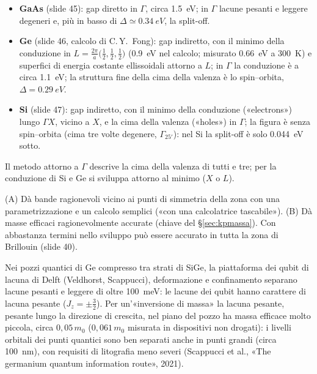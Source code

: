 \documentclass[11pt,a4paper]{article}
\begin{document}
\begin{itemize}[leftmargin=*]
\item \textbf{GaAs} (slide 45): gap diretto in $\Gamma$, circa \SI{1.5}{eV}; in $\Gamma$ lacune pesanti e leggere degeneri e, più in basso
di $\Delta\simeq\SI{0.34}{eV}$, la split-off.
\item \textbf{Ge} (slide 46, calcolo di C.\,Y.~Fong): gap indiretto, con il minimo della conduzione in $L=\frac{2\pi}a\bigl(\frac12,\frac12,\frac12\bigr)$
(\SI{0.9}{eV} nel calcolo; misurato \SI{0.66}{eV} a \SI{300}{K}) e superfici di energia costante ellissoidali attorno a $L$; in $\Gamma$ la
conduzione è a circa \SI{1.1}{eV}; la struttura fine della cima della valenza è lo spin--orbita, $\Delta=\SI{0.29}{eV}$.
\item \textbf{Si} (slide 47): gap indiretto, con il minimo della conduzione («electrons») lungo $\Gamma X$, vicino a $X$, e la cima della valenza
(«holes») in $\Gamma$; la figura è senza spin--orbita (cima tre volte degenere, $\Gamma_{25'}$): nel Si la split-off è solo \SI{0.044}{eV} sotto.
\end{itemize}
Il metodo attorno a $\Gamma$ descrive la cima della valenza di tutti e tre; per la conduzione di Si e Ge si sviluppa attorno al minimo ($X$ o $L$).

(A) Dà bande ragionevoli vicino ai punti di simmetria della zona con una parametrizzazione e un calcolo semplici («con una calcolatrice tascabile»).
(B) Dà masse efficaci ragionevolmente accurate (chiave del §\ref{sec:kpmassa}). Con abbastanza termini nello sviluppo può essere accurato in tutta la
zona di Brillouin (slide 40).

\begin{infobox}
Nei pozzi quantici di Ge compresso tra strati di SiGe, la piattaforma dei qubit di lacuna di Delft (Veldhorst, Scappucci), deformazione e
confinamento separano lacune pesanti e leggere di oltre \SI{100}{meV}: le lacune dei qubit hanno carattere di lacuna pesante ($J_z=\pm\frac32$). Per
un'«inversione di massa» la lacuna pesante, pesante lungo la direzione di crescita, nel piano del pozzo ha massa efficace molto piccola, circa
$0{,}05\,m_0$ ($0{,}061\,m_0$ misurata in dispositivi non drogati): i livelli orbitali dei punti quantici sono ben separati anche in punti grandi (circa
\SI{100}{nm}), con requisiti di litografia meno severi (Scappucci et al., «The germanium quantum information route», 2021).
\end{infobox}
\end{document}
